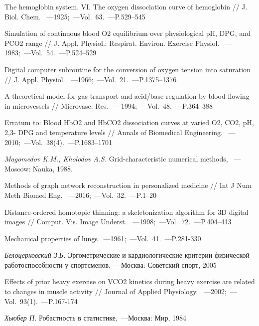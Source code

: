 \begin{thebibliography}{}
     The hemoglobin system. VI. The oxygen
dissociation curve of hemoglobin // J. Biol. Chem. ~---1925;~---Vol.~63.~---P.529–545

     Simulation of continuous
blood O2 equilibrium over physiological pH, DPG, and
PCO2 range // J. Appl. Physiol.: Respirat. Environ. Exercise
Physiol. ~---1983;~---Vol.~54.~---P.524–529

     Digital computer subroutine for the conversion
of oxygen tension into saturation // J. Appl. Physiol. ~---1966;~---Vol.~21.~---P.1375–1376

     A theoretical model for
gas transport and acid/base regulation by blood flowing in
microvessels // Microvasc. Res. ~---1994;~---Vol.~48.~---P.364–388

     Erratum to: Blood HbO2 and HbCO2
dissociation curves at varied O2, CO2, pH, 2,3-
DPG and temperature levels // Annals of Biomedical Engineering. ~---2010;~---Vol.~38(4).~---P.1683–1701

  {\it Magomedov K.M., Kholodov A.S.} Grid-characteristic numerical methods, ~---Moscow:  Nauka, 1988.
 
  Methods of graph network reconstruction in personalized medicine // Int J Num Meth Biomed Eng. ~---2016;~---Vol.~32.~---P.1–20
 
  Distance-ordered homotopic thinning: a skeletonization algorithm for 3D digital images // Comput. Vis. Image Underst. ~---1998;~---Vol.~72.~---P.404--413
 
  Mechanical properties of lungs ~---1961;~---Vol.~41.~---P.281-330

  {\it Белоцерковский З.Б.} Эргометрические и кардиологические критерии физической работоспособности у спортсменов,~---Москва:  Советский спорт, 2005

  Effects of prior heavy exercise on VCO2 kinetics during heavy exercise are related to changes in muscle activity // Journal of Applied Physiology. ~---2002;~---Vol.~93(1).~---P.167-174
 
  {\it Хьюбер П.} Робастность в статистике,~---Москва:  Мир, 1984
  

\end{thebibliography}
